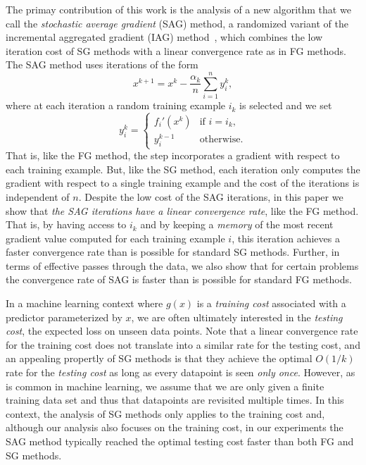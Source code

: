 \documentclass{article}
\begin{document}
The primay contribution of this work is the analysis of a new algorithm that we call the \emph{stochastic average
gradient} (SAG) method, a randomized variant of the incremental aggregated
gradient (IAG) method~\cite{blatt2008convergent}, which combines the low
iteration cost of SG methods with a linear convergence rate as in FG
methods. The SAG method uses iterations of the form
\begin{equation}
\label{eq:SAG}
x^{k+1} = x^k - \frac{\alpha_k}{n}\sum_{i=1}^ny^k_i,
\end{equation}
where at each iteration a random training example $i_k$ is selected and we
set
\[
y^k_i = \begin{cases}
f_i'(x^k) & \textrm{if $i = i_k$,}\\
y^{k-1}_i & \textrm{otherwise.}
\end{cases}
\]
That is, like the FG method, the step incorporates a gradient with respect
to
each training example.  But, like the SG method, each iteration only computes
the gradient with respect to a single training example and the cost of the
iterations is independent of $n$.  Despite the low cost of the SAG
iterations, in this paper we show that  \emph{the SAG iterations have a linear convergence rate}, like the FG method.  That is, by having access to
$i_k$ and by keeping a \emph{memory} of the most recent gradient value
computed for each training example $i$, this iteration achieves a faster
convergence rate than is possible for standard SG methods.
Further, in terms of effective passes through the data, we also show that for certain problems the convergence rate of SAG is faster than is possible for standard FG methods.

In a machine learning context where $g(x)$ is a \emph{training cost} associated with a predictor parameterized by $x$, we 
are often ultimately interested in the \emph{testing cost}, the expected loss on unseen data points.  
Note that a linear convergence rate for the training cost does not translate into a similar rate for the testing cost, and
an appealing
propertly of SG methods is that they achieve the optimal $O(1/k)$ rate for the \emph{testing cost} as long as every datapoint
is seen \emph{only once}.
However, as is common in machine learning, we assume that we are only given a finite training
data set and thus that datapoints are revisited multiple times.  In this context, the analysis
of SG methods only applies to the training cost and, although our analysis also 
focuses on the training cost, in our experiments
the SAG method typically reached the optimal testing cost faster than both FG and SG methods.
\end{document}
